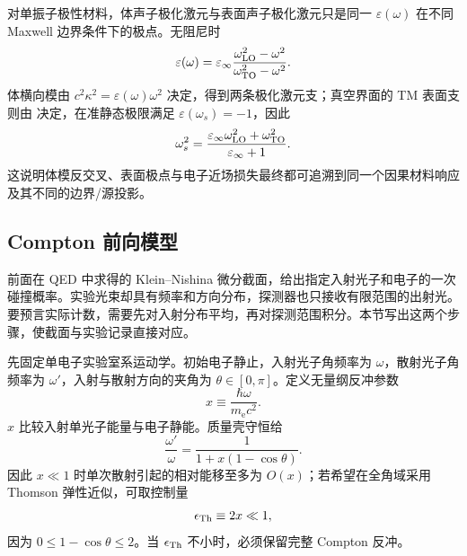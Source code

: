 



对单振子极性材料，体声子极化激元与表面声子极化激元只是同一 $\varepsilon(\omega)$ 在不同 Maxwell 边界条件下的极点。无阻尼时
\begin{equation*}
\varepsilon(\omega)=\varepsilon_\infty
\frac{\omega_{\rm LO}^2-\omega^2}{\omega_{\rm TO}^2-\omega^2}.
\end{equation*}
体横向模由 $c^2\kappa^2=\varepsilon(\omega)\omega^2$ 决定，得到两条极化激元支；真空界面的 TM 表面支则由 决定，在准静态极限满足 $\varepsilon(\omega_s)=-1$，因此
\begin{equation*}
\omega_s^2
=\frac{\varepsilon_\infty\omega_{\rm LO}^2+\omega_{\rm TO}^2}
{\varepsilon_\infty+1}.
\end{equation*}
这说明体模反交叉、表面极点与电子近场损失最终都可追溯到同一个因果材料响应及其不同的边界/源投影。




\subsection{Compton 前向模型}

前面在 QED 中求得的 Klein--Nishina 微分截面，给出指定入射光子和电子的一次碰撞概率。实验光束却具有频率和方向分布，探测器也只接收有限范围的出射光。要预言实际计数，需要先对入射分布平均，再对探测范围积分。本节写出这两个步骤，使截面与实验记录直接对应。

先固定单电子实验室系运动学。初始电子静止，入射光子角频率为 $\omega$，散射光子角频率为 $\omega'$，入射与散射方向的夹角为 $\theta\in[0,\pi]$。定义无量纲反冲参数
\begin{equation*}
x\equiv\frac{\hbar\omega}{m_{\mathrm e} c^2}.
\end{equation*}
$x$ 比较入射单光子能量与电子静能。质量壳守恒给
\begin{equation*}
\frac{\omega'}{\omega}
=\frac{1}{1+x(1-\cos\theta)}.
\end{equation*}
因此 $x\ll1$ 时单次散射引起的相对能移至多为 $O(x)$；若希望在全角域采用 Thomson 弹性近似，可取控制量
\begin{equation*}
\epsilon_{\rm Th}\equiv2x\ll1,
\end{equation*}
因为 $0\le1-\cos\theta\le2$。当 $\epsilon_{\rm Th}$ 不小时，必须保留完整 Compton 反冲。

